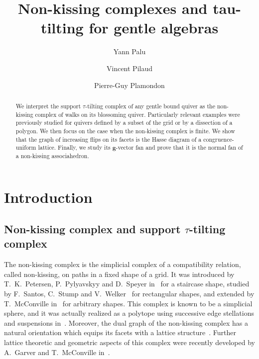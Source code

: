 \documentclass{amsart}
\title{Non-kissing complexes and tau-tilting for gentle algebras}
\author{Yann Palu}
\author{Vincent Pilaud}
\author{Pierre-Guy Plamondon}
\theoremstyle{definition}
\renewcommand{\b}[1]{\mathbf{#1}} %
\begin{document}
\begin{abstract}
We interpret the support $\tau$-tilting complex of any gentle bound quiver as the non-kissing complex of walks on its blossoming quiver.
Particularly relevant examples were previously studied for quivers defined by a subset of the grid or by a dissection of a polygon.
We then focus on the case when the non-kissing complex is finite.
We show that the graph of increasing flips on its facets is the Hasse diagram of a congruence-uniform lattice.
Finally, we study its $\b{g}$-vector fan and prove that it is the normal fan of a non-kissing associahedron.
\end{abstract}


\maketitle

\vspace*{.3cm}
\tableofcontents

\vspace*{-.9cm}
\enlargethispage{.4cm}


\newpage
\section*{Introduction}

\subsection*{Non-kissing complex and support $\tau$-tilting complex}

The non-kissing complex is the simplicial complex of a compatibility relation, called non-kissing, on paths in a fixed shape of a grid.
It was introduced by T.~K.~Petersen, P.~Pylyavskyy and D.~Speyer in~\cite{PetersenPylyavskyySpeyer} for a staircase shape, studied by F.~Santos, C.~Stump and V.~Welker~\cite{SantosStumpWelker} for rectangular shapes, and extended by T.~McConville in~\cite{McConville} for arbitrary shapes.
This complex is known to be a simplicial sphere, and it was actually realized as a polytope using successive edge stellations and suspensions in~\cite[Sect.~4]{McConville}.
Moreover, the dual graph of the non-kissing complex has a natural orientation which equips its facets with a lattice structure~\cite[Thm. 1.1, Sect.~5--8]{McConville}.
Further lattice theoretic and geometric aspects of this complex were recently developed by A.~Garver and T.~McConville in~\cite{GarverMcConville-grid}.
\end{document}
